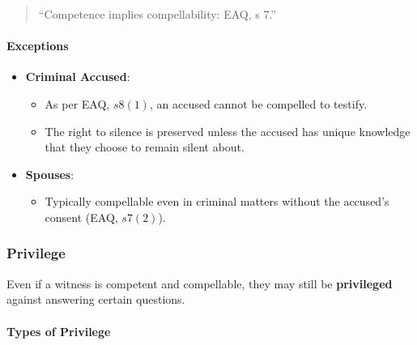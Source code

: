 \begin{quote}
``Competence implies compellability: EAQ, s 7.''
\end{quote}

\paragraph{Exceptions}\label{exceptions}

\begin{itemize}
\tightlist
\item
  \textbf{Criminal Accused}:

  \begin{itemize}
  \tightlist
  \item
    As per EAQ, \(s8(1)\), an accused cannot be compelled to testify.
  \item
    The right to silence is preserved unless the accused has unique
    knowledge that they choose to remain silent about.
  \end{itemize}
\item
  \textbf{Spouses}:

  \begin{itemize}
  \tightlist
  \item
    Typically compellable even in criminal matters without the accused's
    consent (EAQ, \(s7(2)\)).
  \end{itemize}
\end{itemize}

\subsubsection{Privilege}\label{privilege}

Even if a witness is competent and compellable, they may still be
\textbf{privileged} against answering certain questions.

\paragraph{Types of Privilege}\label{types-of-privilege}

